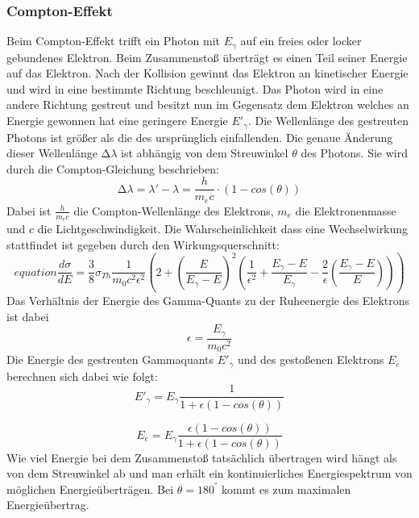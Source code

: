 \subsubsection{Compton-Effekt}
Beim Compton-Effekt trifft ein Photon mit $E_{\gamma}$ auf ein freies oder locker gebundenes Elektron. Beim Zusammenstoß überträgt es einen Teil seiner Energie auf das 
Elektron. Nach der Kollision gewinnt das Elektron an kinetischer Energie und wird in eine bestimmte Richtung beschleunigt. Das Photon wird in eine andere Richtung gestreut 
und besitzt nun im Gegensatz dem Elektron welches an Energie gewonnen hat eine geringere Energie $E'_{\gamma}$. Die Wellenlänge des 
gestreuten Photons ist größer als die des ursprünglich einfallenden. Die genaue Änderung dieser Wellenlänge $\increment\lambda$ ist abhängig von dem Streuwinkel $\theta$ des
Photons. Sie wird durch die Compton-Gleichung beschrieben:
\begin{equation}
    \increment\lambda= \lambda'-\lambda=\frac{h}{m_ec}\cdot(1-cos(\theta)) 
\end{equation}
Dabei ist $\frac{h}{m_ec}$ die Compton-Wellenlänge des Elektrons, \(m_e\) die Elektronenmasse und \(c\) die Lichtgeschwindigkeit.
Die Wahrscheinlichkeit dass eine Wechselwirkung stattfindet ist gegeben durch den Wirkungsquerschnitt:
\begin{equation}
    {equation} \frac{d\sigma}{dE} = \frac{3}{8}\sigma_{Th}\frac{1}{m_0c^2\epsilon^2}\left(2 + \left(\frac{E}{E_{\gamma}-E}\right)^2 \left(\frac{1}{\epsilon^2} + \frac{E_{\gamma}-E}{E_{\gamma}} - \frac{2}{\epsilon}\left(\frac{E_{\gamma}-E}{E}\right)\right)\right)
\end{equation}
Das Verhältnis der Energie des Gamma-Quants zu der Ruheenergie des Elektrons ist dabei
\begin{equation}
    \epsilon=\frac{E_{\gamma}}{m_0c^2}
\end{equation}    
Die Energie des gestreuten Gammaquants $E'_{\gamma}$ und des gestoßenen Elektrons $E_e$ berechnen sich dabei wie folgt:
\begin{equation}
    E'_{\gamma}=E_{\gamma}\frac{1}{1+\epsilon(1-cos(\theta))}
\end{equation}

\begin{equation}
    E_e=E_{\gamma}\frac{\epsilon(1-cos(\theta))}{1+\epsilon(1-cos(\theta))}
\end{equation}
Wie viel Energie bei dem Zusammenstoß tatsächlich übertragen wird hängt als von dem Streuwinkel ab und man erhält ein kontinuierliches 
Energiespektrum von möglichen Energieüberträgen. Bei $\theta= 180^°$ kommt es zum maximalen Energieübertrag.
\cite{Compton_theorie}


